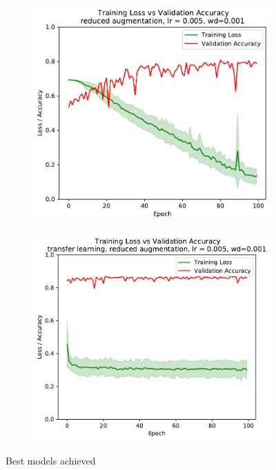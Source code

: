 \documentclass[sigconf,nonacm]{acmart}
\begin{document}
\begin{figure}[ht]
\begin{subfigure}[c]{0.45\columnwidth}
\includegraphics[width=\textwidth]{plot_best.pdf}
\end{subfigure}
\hspace{2pt}
\begin{subfigure}[c]{0.45\columnwidth}
\includegraphics[width=\textwidth]{plot_transfer.pdf}
\end{subfigure}
\vspace{-.7\baselineskip}
\caption{Best models achieved}
\label{part3:best}
\end{figure}




\end{document}
